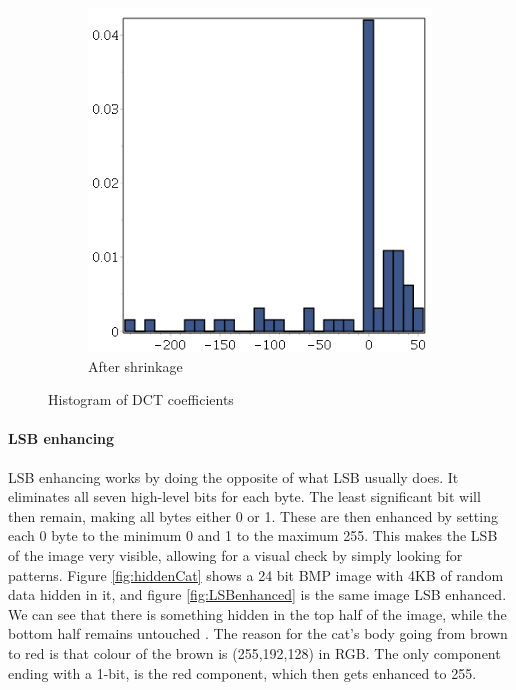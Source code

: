 \begin{figure}
\begin{subfigure}[b]{0.45\textwidth}
		\includegraphics[width=\textwidth]{figures/outputF5.png}
		\caption{After shrinkage}
		\label{fig:outputF5}
    \end{subfigure}
    \caption{Histogram of DCT coefficients}
\end{figure}

\paragraph*{LSB enhancing}
LSB enhancing works by doing the opposite of what LSB usually does.
It eliminates all seven high-level bits for each byte. 
The least significant bit will then remain, making all bytes either 0 or 1.
These are then enhanced by setting each 0 byte to the minimum 0 and 1 to the maximum 255.
This makes the LSB of the image very visible, allowing for a visual check by simply looking for patterns.
Figure \ref{fig:hiddenCat} shows a 24 bit BMP image with 4KB of random data hidden in it, and figure \ref{fig:LSBenhanced} is the same image LSB enhanced.
We can see that there is something hidden in the top half of the image, while the bottom half remains untouched \citep{Westfeld2000}. The reason for the cat's body going from brown to red is that colour of the brown is (255,192,128) in RGB. The only component ending with a 1-bit, is the red component, which then gets enhanced to 255.


